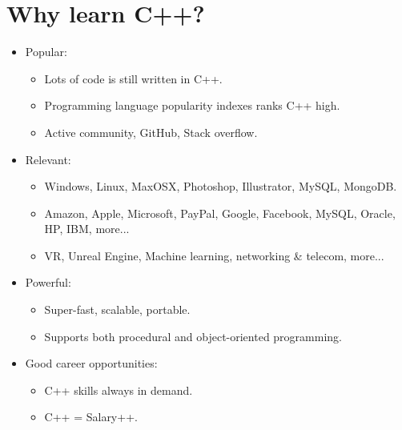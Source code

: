 \section{Why learn C++?}
\begin{itemize}
    \item Popular: 
        \begin{itemize}
            \item Lots of code is still written in C++.
            \item Programming language popularity indexes ranks C++ high.
            \item Active community, GitHub, Stack overflow.
        \end{itemize}

    \item Relevant: 
        \begin{itemize}
            \item Windows, Linux, MaxOSX, Photoshop, Illustrator, MySQL, MongoDB.
            \item Amazon, Apple, Microsoft, PayPal, Google, Facebook, MySQL, Oracle, HP, IBM, more... 
            \item VR, Unreal Engine, Machine learning, networking \& telecom, more...
        \end{itemize}
    
    \item Powerful: 
        \begin{itemize}
            \item Super-fast, scalable, portable.
            \item Supports both procedural and object-oriented programming.
        \end{itemize}
    
    \item Good career opportunities:
        \begin{itemize}
            \item C++ skills always in demand.
            \item C++ = Salary++.
        \end{itemize}
\end{itemize}




